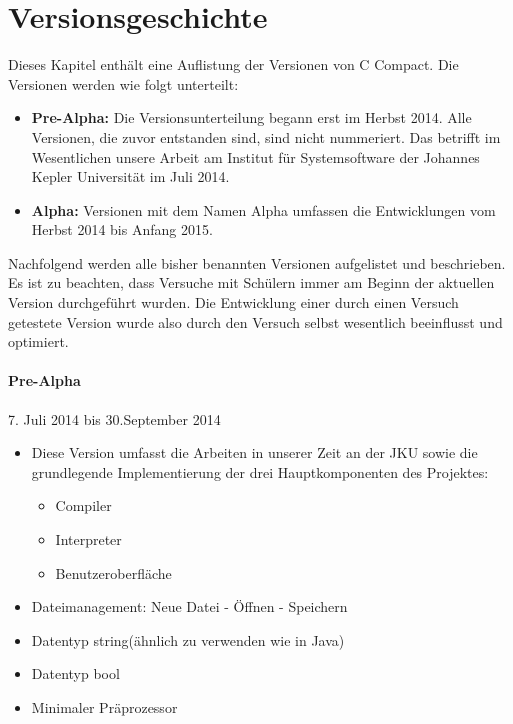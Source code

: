 

\chapter{Versionsgeschichte}
\label{sec:versions}
Dieses Kapitel enthält eine Auflistung der Versionen von C Compact. Die Versionen werden wie folgt unterteilt:
\begin{itemize}
\item \textbf{Pre-Alpha:} Die Versionsunterteilung begann erst im Herbst 2014. Alle Versionen, die zuvor entstanden sind, sind nicht nummeriert. Das betrifft im Wesentlichen unsere Arbeit am Institut für Systemsoftware der Johannes Kepler Universität im Juli 2014.
\item \textbf{Alpha:} Versionen mit dem Namen Alpha umfassen die Entwicklungen vom Herbst 2014 bis Anfang 2015.
\end{itemize}

Nachfolgend werden alle bisher benannten Versionen aufgelistet und beschrieben. Es ist zu beachten, dass Versuche mit Schülern immer am Beginn der aktuellen Version durchgeführt wurden. Die Entwicklung einer durch einen Versuch getestete Version wurde also durch den Versuch selbst wesentlich beeinflusst und optimiert.

\subsubsection*{Pre-Alpha}
7. Juli 2014 bis 30.September 2014
\begin{itemize}
\item Diese Version umfasst die Arbeiten in unserer Zeit an der JKU sowie die grundlegende Implementierung der drei Hauptkomponenten des Projektes:
\begin{itemize}
\item Compiler
\item Interpreter
\item Benutzeroberfläche
\end{itemize}
\item Dateimanagement: Neue Datei - Öffnen - Speichern
\item Datentyp \glqq string\grqq (ähnlich zu verwenden wie in Java)
\item Datentyp \glqq bool\grqq
\item Minimaler Präprozessor
\end{itemize}

